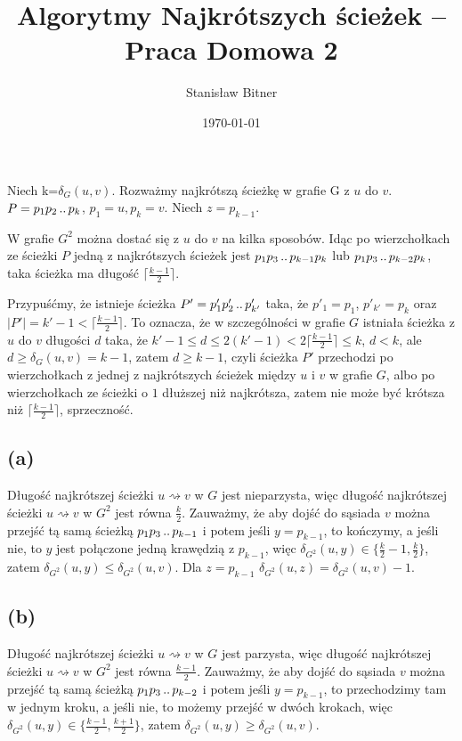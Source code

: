 \documentclass[11pt]{article}
\title{Algorytmy Najkrótszych ścieżek -- Praca Domowa 2}
\author{Stanisław Bitner}
\date{\today}
\newcommand{\dd}{\mathinner{{\ldotp}{\ldotp}}}
\begin{document}
\maketitle

\section{}

Niech k=$\delta_G(u,v)$. Rozważmy najkrótszą ścieżkę w grafie G z $u$ do $v$.
$P = p_1 p_2 \dd p_k$, $p_1=u, p_k=v$. Niech $z=p_{k-1}$.

W grafie $G^2$ można dostać się z $u$ do $v$ na kilka sposobów. Idąc po
wierzchołkach ze ścieżki $P$ jedną z najkrótszych ścieżek jest $p_1 p_3 \dd
p_{k-1} p_k$ lub $p_1 p_3 \dd p_{k-2} p_{k}$, taka ścieżka ma długość
$\lceil\frac{k-1}{2}\rceil$.

Przypuśćmy, że istnieje ścieżka $P'=p'_1 p'_2 \dd p'_{k'}$ taka, że $p'_1 =
p_1$, $p'_{k'}=p_k$ oraz $|P'| = k'-1 < \lceil\frac{k-1}{2}\rceil$. To oznacza,
że w szczególności w grafie $G$ istniała ścieżka z $u$ do $v$ długości $d$
taka, że $k'-1 \le d \le 2(k'-1) < 2\lceil\frac{k-1}{2}\rceil \le k$, $d<k$,
ale $d\ge \delta_G(u,v)=k-1$, zatem $d \ge k-1$, czyli ścieżka $P'$ przechodzi po
wierzchołkach z jednej z najkrótszych ścieżek między $u$ i $v$ w grafie $G$,
albo po wierzchołkach ze ścieżki o $1$ dłuższej niż najkrótsza, zatem nie może
być krótsza niż $\lceil\frac{k-1}{2}\rceil$, sprzeczność.

\subsection*{(a)}

Długość najkrótszej ścieżki $u \rightsquigarrow v$ w $G$ jest nieparzysta, więc
długość najkrótszej ścieżki $u \rightsquigarrow v$ w $G^2$ jest równa
$\frac{k}{2}$. Zauważmy, że aby dojść do sąsiada $v$ można przejść tą samą
ścieżką $p_1 p_3 \dd p_{k-1}$ i potem jeśli $y=p_{k-1}$, to kończymy, a jeśli
nie, to $y$ jest połączone jedną krawędzią z $p_{k-1}$, więc $\delta_{G^2}(u,y)
\in \{\frac{k}{2}-1, \frac{k}{2}\}$, zatem $\delta_{G^2}(u,y) \le
\delta_{G^2}(u,v)$. Dla $z=p_{k-1}$ $\delta_{G^2}(u,z)=\delta_{G^2}(u,v)-1$.

\subsection*{(b)}

Długość najkrótszej ścieżki $u \rightsquigarrow v$ w $G$ jest parzysta, więc
długość najkrótszej ścieżki $u \rightsquigarrow v$ w $G^2$ jest równa
$\frac{k-1}{2}$. Zauważmy, że aby dojść do sąsiada $v$ można przejść tą samą
ścieżką $p_1 p_3 \dd p_{k-2}$ i potem jeśli $y=p_{k-1}$, to przechodzimy tam w
jednym kroku, a jeśli nie, to możemy przejść w dwóch krokach, więc
$\delta_{G^2}(u,y) \in \{\frac{k-1}{2}, \frac{k+1}{2}\}$, zatem
$\delta_{G^2}(u,y) \ge \delta_{G^2}(u,v)$.
\end{document}
